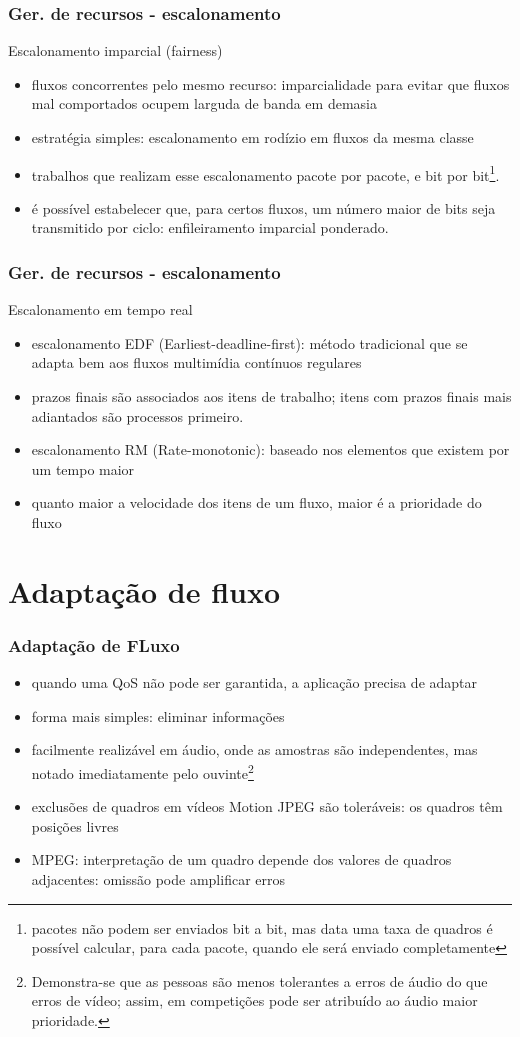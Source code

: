 \documentclass[]{beamer}
\begin{document}
\begin{frame}
  \frametitle{Ger. de recursos - escalonamento}
Escalonamento imparcial (fairness)
\begin{itemize}
  \item fluxos concorrentes pelo mesmo recurso: imparcialidade para evitar que
fluxos mal comportados ocupem larguda de banda em demasia
  \item estratégia simples: escalonamento em rodízio em fluxos da mesma classe
  \item trabalhos que realizam esse escalonamento pacote por pacote, e bit por 
bit\footnote{pacotes não podem ser enviados bit a bit, mas data uma taxa de quadros é possível
calcular, para cada pacote, quando ele será enviado completamente}.
  \item é possível estabelecer que, para certos fluxos, um número maior de bits seja transmitido
por ciclo: enfileiramento imparcial ponderado.
\end{itemize}
\end{frame}

\begin{frame}
  \frametitle{Ger. de recursos - escalonamento}
Escalonamento em tempo real
\begin{itemize}
  \item escalonamento EDF (Earliest-deadline-first): método tradicional que se adapta
bem aos fluxos multimídia contínuos regulares
  \item prazos finais são associados aos itens de trabalho; itens com prazos finais mais
adiantados são processos primeiro.
  \item escalonamento RM (Rate-monotonic): baseado nos elementos que existem por um tempo maior
  \item quanto maior a velocidade dos itens de um fluxo, maior é a prioridade do fluxo
\end{itemize}
\end{frame}

\section{Adaptação de fluxo}

\begin{frame}
 \frametitle{Adaptação de FLuxo}
 \begin{itemize}
   \item quando uma QoS não pode ser garantida, a aplicação precisa de adaptar
   \item forma mais simples: eliminar informações
   \item facilmente realizável em áudio, onde as amostras são independentes, mas notado
imediatamente pelo ouvinte\footnote{Demonstra-se que as pessoas são menos tolerantes a erros
de áudio do que erros de vídeo; assim, em competições pode ser atribuído ao áudio
maior prioridade.\cite{Liao:1997}}
   \item exclusões de quadros em vídeos Motion JPEG são toleráveis: os quadros têm posições livres
   \item MPEG: interpretação de um quadro depende dos valores de quadros adjacentes: omissão
pode amplificar erros
  \end{itemize}
\end{frame}
\end{document}

